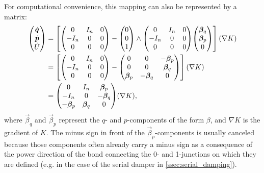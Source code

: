 For computational convenience, this mapping can also be represented by a matrix: 
\begin{equation}
    \begin{split}
        \mqty(\dot{\vec{q}} \\ \dot{\vec{p}} \\ \dot{U}) 
              &= \qty[\mqty( 0 & I_n & 0 \\  -I_n & 0 & 0 \\ 0 & 0 & 0) 
                - \mqty(0 \\ 0 \\ 1) \wedge \mqty( 0 & I_n & 0 \\  -I_n & 0 & 0 \\ 0 & 0 & 0) \mqty(\vec{\beta}_{q} \\ \vec{\beta}_{p}\\0)](\nabla K) \\
              &= \qty[\mqty( 0 & I_n & 0 \\  -I_n & 0 & 0 \\ 0 & 0 & 0) 
                 - \mqty(0 & 0 & -\vec{\beta}_p \\ 0 & 0 & \vec{\beta}_q \\ \vec{\beta}_p &  -\vec{\beta}_q & 0 )](\nabla K) \\
              &= \mqty( 0 & I_n & \vec{\beta}_p \\  -I_n & 0 & -\vec{\beta}_q \\ -\vec{\beta}_p & \vec{\beta}_q & 0)(\nabla K),
    \end{split}
    \label{eq:matrix_jacobi_mapping}
\end{equation}
where \(\vec{\beta}_q\) and \(\vec{\beta}_p\) represent the \(q\)- and \(p\)-components of the form \(\beta\), and \(\nabla K\) is the gradient of \(K\). The minus sign in front of the \(\vec{\beta}_p\)-components is usually canceled because those components often already carry a minus sign as a consequence of the power direction of the bond connecting the 0- and 1-junctions on which they are defined (e.g. in the case of the serial damper in \cref{ssec:serial_damping}).

